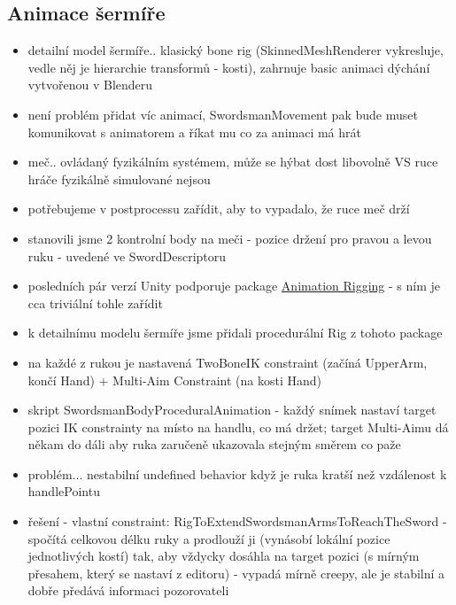 \subsection{Animace šermíře} \label{swordsmanAnimationSubsection}
\begin{itemize}
  \item detailní model šermíře.. klasický bone rig (SkinnedMeshRenderer vykresluje, vedle něj je hierarchie transformů - kosti), zahrnuje basic animaci dýchání vytvořenou v Blenderu
  \item není problém přidat víc animací, SwordsmanMovement pak bude muset komunikovat s animatorem a říkat mu co za animaci má hrát
  \item meč.. ovládaný fyzikálním systémem, může se hýbat dost libovolně VS ruce hráče fyzikálně simulované nejsou
  \item potřebujeme v postprocessu zařídit, aby to vypadalo, že ruce meč drží
  \item stanovili jsme 2 kontrolní body na meči - pozice držení pro pravou a levou ruku - uvedené ve SwordDescriptoru
  \item posledních pár verzí Unity podporuje package \href{https://docs.unity3d.com/Packages/com.unity.animation.rigging@1.3/manual/index.html}{Animation Rigging} - s ním je cca triviální tohle zařídit
  \item k detailnímu modelu šermíře jsme přidali procedurální Rig z tohoto package
  \item na každé z rukou je nastavená TwoBoneIK constraint (začíná UpperArm, končí Hand) + Multi-Aim Constraint (na kosti Hand)
  \item skript SwordsmanBodyProceduralAnimation - každý snímek nastaví target pozici IK constrainty na místo na handlu, co má držet; target Multi-Aimu dá někam do dáli aby ruka zaručeně ukazovala stejným směrem co paže 
  \item problém... nestabilní undefined behavior když je ruka kratší než vzdálenost k handlePointu
  \item řešení - vlastní constraint: RigToExtendSwordsmanArmsToReachTheSword - spočítá celkovou délku ruky a prodlouží ji (vynásobí lokální pozice jednotlivých kostí) tak, aby vždycky dosáhla na target pozici (s mírným přesahem, který se nastaví z editoru) - vypadá mírně creepy, ale je stabilní a dobře předává informaci pozorovateli
\end{itemize}


